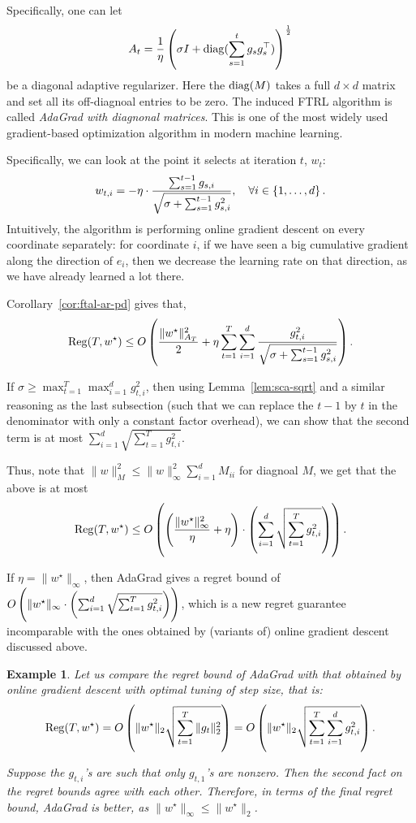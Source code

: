 \documentclass{article}
\newtheorem{example}{Example}
\DeclareMathOperator*{\diag}{{\rm diag}}
\DeclareMathOperator*{\Reg}{{\rm Reg}}
\begin{document}
Specifically, one can let
\[ A_t = \frac1\eta \del{\sigma I + \diag( \sum_{s=1}^t g_s g_s^\top) }^\frac12\] be a diagonal adaptive regularizer. Here the $\diag(M)$ takes a full $d \times d$ matrix and set all its off-diagnoal entries to be zero.
The induced FTRL algorithm is called {\em AdaGrad with diagnonal matrices}. This is one of the most widely used gradient-based optimization algorithm in modern machine learning.

Specifically, we can look at the point it selects at iteration $t$, $w_t$:
\[ w_{t,i} = -\eta \cdot \frac{\sum_{s=1}^{t-1} g_{s,i}}{\sqrt{\sigma + \sum_{s=1}^{t-1} g_{s,i}^2}}, \quad \forall i \in \cbr{1,\ldots,d}. \]
Intuitively, the algorithm is performing online gradient descent on every coordinate separately: for coordinate $i$, if we have seen a big cumulative gradient along the direction of $e_i$, then we decrease the learning rate on that direction, as we have already learned a lot there.

Corollary~\ref{cor:ftal-ar-pd} gives that,
\[ \Reg(T, w^\star) \leq O\del{ \frac{\| w^\star \|_{A_T}^2}{2} + \eta \sum_{t=1}^T \sum_{i=1}^d \frac{g_{t,i}^2}{\sqrt{\sigma + \sum_{s=1}^{t-1} g_{s,i}^2}}}. \]

If $\sigma \geq \max_{t=1}^T \max_{i=1}^d g_{t,i}^2$, then using Lemma~\ref{lem:sca-sqrt} and a similar reasoning as the last subsection (such that we can replace the $t-1$ by $t$ in the denominator with only a constant factor overhead), we can show that the second term is at most $\sum_{i=1}^d \sqrt{\sum_{t=1}^T g_{t,i}^2}$.

Thus, note that $\| w \|_M^2 \leq \| w \|_\infty^2 \sum_{i=1}^d M_{ii}$ for diagnoal $M$, we get that the above is at most
\[ \Reg(T, w^\star) \leq O\del{ \del{\frac{\| w^\star \|_\infty^2}{\eta} + \eta} \cdot \del{\sum_{i=1}^d \sqrt{\sum_{t=1}^T g_{t,i}^2}} }. \]

If $\eta = \| w^\star \|_\infty$, then AdaGrad gives a regret bound of $O\del{ \| w^\star \|_\infty \cdot \del{\sum_{i=1}^d \sqrt{\sum_{t=1}^T g_{t,i}^2}} }$, which is a new regret guarantee incomparable with the ones obtained by (variants of) online gradient descent discussed above.

\begin{example}
Let us compare the regret bound of AdaGrad with that obtained by online gradient descent with optimal tuning of step size, that is:
\[ \Reg(T, w^\star) = O\del{\| w^\star \|_2 \sqrt{\sum_{t=1}^T \| g_t \|_2^2 }} = O\del{\| w^\star \|_2 \sqrt{\sum_{t=1}^T \sum_{i=1}^d g_{t,i}^2 }}. \]

Suppose the $g_{t,i}$'s are such that only $g_{t,1}$'s are nonzero. Then the second fact on the regret bounds agree with each other. Therefore, in terms of the final regret bound, AdaGrad is better, as $\|w^\star\|_\infty \leq \| w^\star\|_2$.

\end{example}
\end{document}

